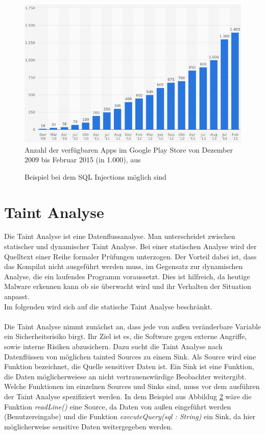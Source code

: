 \documentclass[runningheads]{llncs}
\begin{document}
\begin{figure}[htp]
\centering
\includegraphics[scale=0.60]{img/playstore.png}
\caption{Anzahl der verfügbaren Apps im Google Play Store von Dezember 2009 bis Februar 2015 (in 1.000), aus \cite{playstore}}
\label{fig:playstore}
\end{figure} 

\begin{figure}

\caption{Beispiel bei dem SQL Injections möglich sind}
\label{fig:sql_code}
\end{figure}

\section{Taint Analyse}\label{sec:taintAnalyse}
Die Taint Analyse ist eine Datenflussanalyse. Man unterscheidet zwischen statischer und dynamischer Taint Analyse. Bei einer statischen Analyse wird der Quelltext einer Reihe formaler Prüfungen unterzogen. Der Vorteil dabei ist, dass das Kompilat nicht ausgeführt werden muss, im Gegensatz zur dynamischen Analyse, die ein laufendes Programm voraussetzt. Dies ist hilfreich, da heutige Malware erkennen kann ob sie überwacht wird und ihr Verhalten der Situation anpasst. \\
Im folgenden wird sich auf die statische Taint Analyse beschränkt.\\\\
Die Taint Analyse nimmt zunächst an, dass jede von außen veränderbare Variable ein Sicherheitsrisiko birgt. Ihr Ziel ist es, die Software gegen externe Angriffe, sowie interne Risiken abzusichern. Dazu sucht die Taint Analyse nach Datenflüssen von möglichen tainted Sources zu einem Sink. Als Source wird eine Funktion bezeichnet, die Quelle sensitiver Daten ist. Ein Sink ist eine Funktion, die Daten möglicherweiese an nicht vertrauenswürdige Beobachter weitergibt. Welche Funktionen im einzelnen Sources und Sinks sind, muss vor dem ausführen der Taint Analyse spezifiziert werden. In dem Beispiel aus Abbildug \ref{fig:sql_code} wäre die Funktion \emph{readLine()} eine Source, da Daten von außen eingeführt werden (Benutzereingabe) und die Funktion \emph{executeQuery(sql : String)} ein Sink, da hier möglicherweise sensitive Daten weitergegeben werden.
\end{document}

